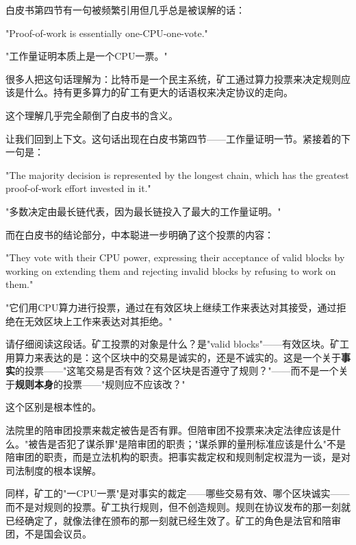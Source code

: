 \documentclass[a4paper,12pt,openany]{ctexbook}
\newenvironment{quoting}{%
  \par\vspace{0.5em}%
  \begin{list}{}{%
    \setlength{\leftmargin}{2em}%
    \setlength{\rightmargin}{2em}%
    \setlength{\parsep}{0.3em}%
    \setlength{\itemsep}{0pt}%
    \setlength{\topsep}{0pt}%
  }%
  \item\relax
}{%
  \end{list}%
  \par\vspace{0.5em}%
}
\begin{document}
白皮书第四节有一句被频繁引用但几乎总是被误解的话：


\begin{quoting}
\small
"Proof-of-work is essentially one-CPU-one-vote."

"工作量证明本质上是一个CPU一票。"
\end{quoting}


很多人把这句话理解为：比特币是一个民主系统，矿工通过算力投票来决定规则应该是什么。持有更多算力的矿工有更大的话语权来决定协议的走向。

这个理解几乎完全颠倒了白皮书的含义。

让我们回到上下文。这句话出现在白皮书第四节——工作量证明一节。紧接着的下一句是：


\begin{quoting}
\small
"The majority decision is represented by the longest chain, which has the greatest proof-of-work effort invested in it."

"多数决定由最长链代表，因为最长链投入了最大的工作量证明。"
\end{quoting}


而在白皮书的结论部分，中本聪进一步明确了这个投票的内容：


\begin{quoting}
\small
"They vote with their CPU power, expressing their acceptance of valid blocks by working on extending them and rejecting invalid blocks by refusing to work on them."

"它们用CPU算力进行投票，通过在有效区块上继续工作来表达对其接受，通过拒绝在无效区块上工作来表达对其拒绝。"
\end{quoting}


请仔细阅读这段话。矿工投票的对象是什么？是"valid blocks"——有效区块。矿工用算力来表达的是：这个区块中的交易是诚实的，还是不诚实的。这是一个关于\textbf{事实}的投票——"这笔交易是否有效？这个区块是否遵守了规则？"——而不是一个关于\textbf{规则本身}的投票——"规则应不应该改？"

这个区别是根本性的。

法院里的陪审团投票来裁定被告是否有罪。但陪审团不投票来决定法律应该是什么。"被告是否犯了谋杀罪"是陪审团的职责；"谋杀罪的量刑标准应该是什么"不是陪审团的职责，而是立法机构的职责。把事实裁定权和规则制定权混为一谈，是对司法制度的根本误解。

同样，矿工的"一CPU一票"是对事实的裁定——哪些交易有效、哪个区块诚实——而不是对规则的投票。矿工执行规则，但不创造规则。规则在协议发布的那一刻就已经确定了，就像法律在颁布的那一刻就已经生效了。矿工的角色是法官和陪审团，不是国会议员。
\end{document}
